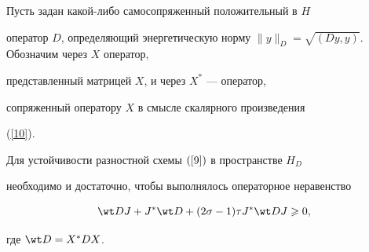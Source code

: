 Пусть задан какой-либо самосопряженный положительный в $H$


оператор $D$, определяющий энергетическую норму $\| y


\|_D=\sqrt {(Dy,y)}$. Обозначим через $X$ оператор,


представленный матрицей $X$, и через $X^{*}$ --- оператор,


сопряженный оператору $X$ в смысле скалярного произведения


(\ref{10}).





\begin{thm}\label{theorem1}


Для устойчивости разностной схемы $(\ref{9})$ в пространстве $H_{D}$


необходимо и достаточно, чтобы выполнялось операторное неравенство


\begin{equation}\label{29}


\wt DJ+J^* \wt D+(2\sigma-1)\tau J^* \wt


DJ\geqslant 0,


\end{equation}


где $ \wt D=X^{*}DX $.


\end{thm}





